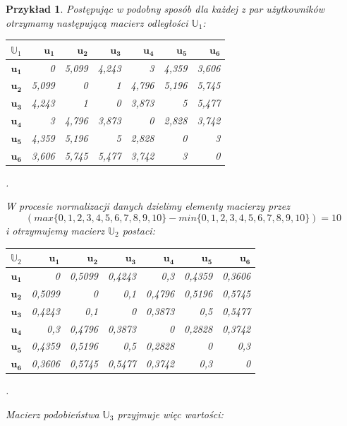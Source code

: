 \documentclass[12pt,a4paper]{report}
\newtheorem{przyklad}{Przykład}[chapter]
\begin{document}
\begin{przyklad}
Postępując w podobny sposób dla każdej z par użytkowników otrzymamy następującą macierz odległości $\mathbb{U}_1$:
\begin{center}
\begin{tabular}{|r|r|r|r|r|r|r|} \hline
$\mathbb{U}_1$ & $\mathbf{u_1}$ & $\mathbf{u_2}$ & $\mathbf{u_3}$ & $\mathbf{u_4}$ & $\mathbf{u_5}$ & $\mathbf{u_6}$ \\
\hline
$\mathbf{u_1}$ & 0 & 5,099 & 4,243 & 3 & 4,359 & 3,606 \\
\hline
$\mathbf{u_2}$ & 5,099 & 0 & 1 & 4,796 & 5,196 & 5,745 \\
\hline
$\mathbf{u_3}$ & 4,243 & 1 & 0 & 3,873 & 5 & 5,477 \\
\hline
$\mathbf{u_4}$ & 3 & 4,796 & 3,873 & 0 & 2,828 & 3,742  \\
\hline 
$\mathbf{u_5}$ & 4,359 & 5,196 & 5 & 2,828 & 0 & 3 \\
\hline 
$\mathbf{u_6}$ & 3,606 & 5,745 & 5,477 & 3,742 & 3 & 0  \\
\hline 
\end{tabular}.
\end{center}
W procesie normalizacji danych dzielimy elementy macierzy przez 
$$
(max\{0,1,2,3,4,5,6,7,8,9,10\} - min\{0,1,2,3,4,5,6,7,8,9,10\}) = 10
$$ 
i otrzymujemy macierz $\mathbb{U}_2$ postaci:
\begin{center}
\begin{tabular}{|r|r|r|r|r|r|r|} \hline
$\mathbb{U}_2$ & $\mathbf{u_1}$ & $\mathbf{u_2}$ & $\mathbf{u_3}$ & $\mathbf{u_4}$ & $\mathbf{u_5}$ & $\mathbf{u_6}$ \\
\hline
$\mathbf{u_1}$ & 0 & 0,5099 & 0,4243 & 0,3 & 0,4359 & 0,3606 \\
\hline
$\mathbf{u_2}$ & 0,5099 & 0 & 0,1 & 0,4796 & 0,5196 & 0,5745 \\
\hline
$\mathbf{u_3}$ & 0,4243 & 0,1 & 0 & 0,3873 & 0,5 & 0,5477 \\
\hline
$\mathbf{u_4}$ & 0,3 & 0,4796 & 0,3873 & 0 & 0,2828 & 0,3742 \\ 
\hline 
$\mathbf{u_5}$ & 0,4359 & 0,5196 & 0,5 & 0,2828 & 0 & 0,3 \\
\hline 
$\mathbf{u_6}$ & 0,3606 & 0,5745 & 0,5477 & 0,3742 & 0,3 & 0 \\ 
\hline 
\end{tabular}.
\end{center}
Macierz podobieństwa $\mathbb{U}_3$ przyjmuje więc wartości:
\begin{center}
\begin{tabular}{|r|r|r|r|r|r|r|} \hline

\end{tabular}
\end{center}
\end{przyklad}
\end{document}
